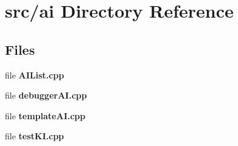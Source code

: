 \section{src/ai Directory Reference}
\label{dir_128a93aeeff33a8423f079f46929dbb3}
\subsection*{Files}
\begin{DoxyCompactItemize}
\item 
file {\bfseries A\-I\-List.\-cpp}
\item 
file {\bfseries debugger\-A\-I.\-cpp}
\item 
file {\bfseries template\-A\-I.\-cpp}
\item 
file {\bfseries test\-K\-I.\-cpp}
\end{DoxyCompactItemize}
